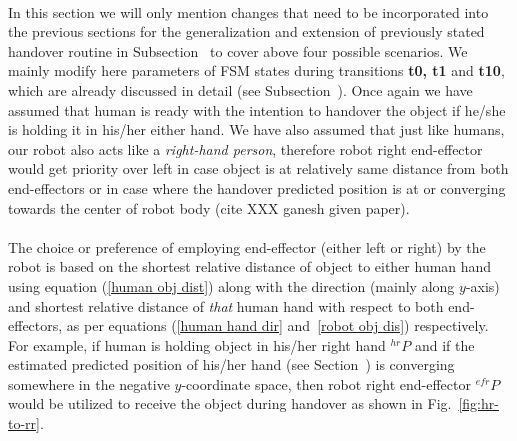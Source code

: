 \documentclass[a4paper, 12pt, oneside]{Thesis}  %
\begin{document}
\paragraph*{}
In this section we will only mention changes that need to be incorporated into the previous sections for the generalization and extension of previously stated handover routine in Subsection~ to cover above four possible scenarios. We mainly modify here parameters of FSM states during transitions {\bf t0, t1} and {\bf t10}, which are already discussed in detail (see Subsection~). Once again we have assumed that human is ready with the intention to handover the object if he/she is holding it in his/her either hand. We have also assumed that just like humans, our robot also acts like a \textit{right-hand person}, therefore robot right end-effector would get priority over left in case object is at relatively same distance from both end-effectors or in case where the handover predicted position is at or converging towards the center of robot body (cite XXX ganesh given paper). 

\paragraph*{}
The choice or preference of employing end-effector (either left or right) by the robot is based on the shortest relative distance of object to either human hand using equation (\ref{human obj dist}) along with the direction (mainly along $y$-axis) and shortest relative distance of \textit{that} human hand with respect to both end-effectors, as per equations (\ref{human hand dir} and~\ref{robot obj dis}) respectively. For example, if human is holding object in his/her right hand ${}^{hr}{P}$ and if the estimated predicted position of his/her hand (see Section~) is converging somewhere in the negative $y$-coordinate space, then robot right end-effector ${}^{efr}{P}$ would be utilized to receive the object during handover as shown in Fig.~\ref{fig:hr-to-rr}.
\end{document}
